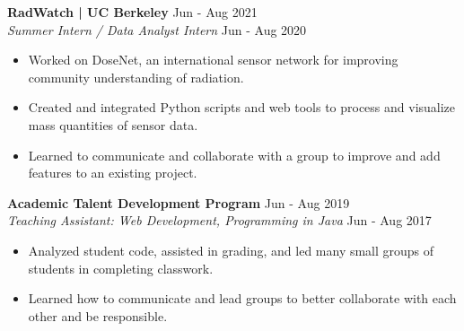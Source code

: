 \documentclass[letterpaper,10pt]{extarticle}
\begin{document}

\noindent
\textbf{RadWatch | UC Berkeley} \hfill Jun - Aug 2021 \\
\textit{Summer Intern / Data Analyst Intern} \hfill Jun - Aug 2020
\begin{itemize}
    \item Worked on DoseNet, an international sensor network for improving community understanding of radiation.
    \item Created and integrated Python scripts and web tools to process and visualize mass quantities of sensor data.
    \item Learned to communicate and collaborate with a group to improve and add features to an existing project.
\end{itemize}

\noindent
\textbf{Academic Talent Development Program} \hfill Jun - Aug 2019\\ %
\textit{Teaching Assistant: Web Development, Programming in Java} \hfill Jun - Aug 2017 %
\begin{itemize}
    \item Analyzed student code, assisted in grading, and led many small groups of students in completing classwork.
    \item Learned how to communicate and lead groups to better collaborate with each other and be responsible.
\end{itemize}
\end{document}
